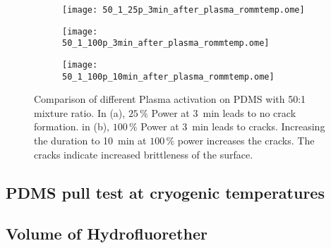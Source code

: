 \begin{figure}[hbt!]
	\centering
	\begin{subfigure}[]{0.45\textwidth}
		\centering
		\texttt{[image: 50\_1\_25p\_3min\_after\_plasma\_rommtemp.ome]}
		\caption{}
	\end{subfigure}
	\begin{subfigure}[]{0.45\textwidth}
		\centering
		\texttt{[image: 50\_1\_100p\_3min\_after\_plasma\_rommtemp.ome]}
		\caption{}
	\end{subfigure}
	\begin{subfigure}[]{0.45\textwidth}
		\centering
		\texttt{[image: 50\_1\_100p\_10min\_after\_plasma\_rommtemp.ome]}
		\caption{}
	\end{subfigure}
	\caption{Comparison of different Plasma activation on PDMS with 50:1 mixture ratio. In (a), $25\,\%$ Power at \SI{3}{\minute} leads to no crack formation. in (b), $100\,\%$ Power at \SI{3}{\minute} leads to cracks. Increasing the duration to \SI{10}{\minute} at $100\,\%$ power increases the cracks. The cracks indicate increased brittleness of the surface.}
	\label{fig:Vgl50:1Plasma}
\end{figure}

\FloatBarrier

\subsection{PDMS pull test at cryogenic temperatures}






\subsection{Volume of Hydrofluorether}

